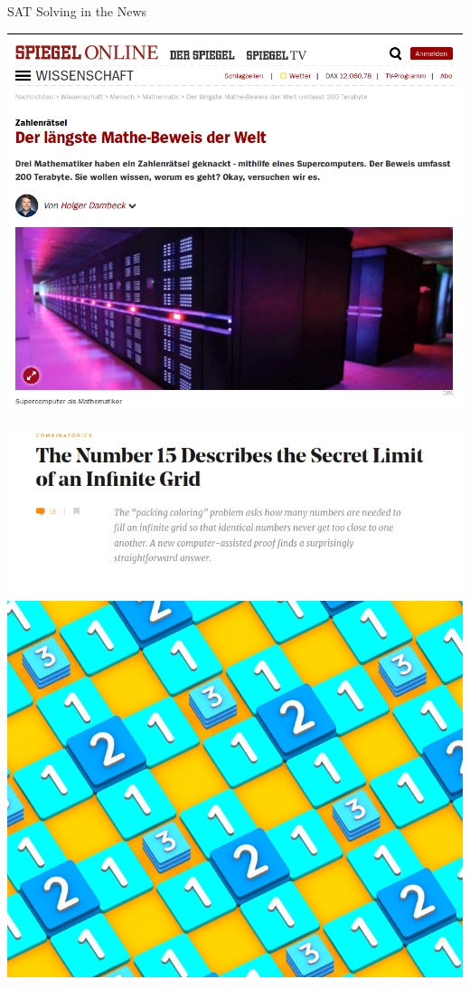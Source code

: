 \documentclass[t]{sdqbeamer}
\begin{document}
\begin{frame}{SAT Solving in the News}
	\begin{minipage}{0.6\textwidth}
		\centering
		\includegraphics[height=0.75\textheight]{figures/l01/triples-spiegel.png}
	\end{minipage}%
	\begin{minipage}{0.4\textwidth}
		\centering
		\includegraphics[height=0.75\textheight]{figures/l01/infinite-square-grid-article.png}
	\end{minipage}%
\end{frame}
\end{document}
